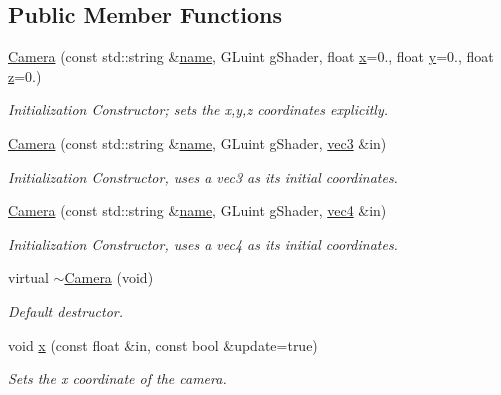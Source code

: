 \subsection*{Public Member Functions}
\begin{DoxyCompactItemize}
\item 
\hyperlink{class_camera_a16516fa8c830cecef5c8eb43eff12783}{Camera} (const std\-::string \&\hyperlink{class_object_aafd766fce2598f718cac97a3ac731706}{name}, G\-Luint g\-Shader, float \hyperlink{class_camera_a14d59ca64bf258adacbed4e0e70ba701}{x}=0., float \hyperlink{class_camera_a5021b8379a853f306851837178856db0}{y}=0., float \hyperlink{class_camera_a4acfa20291c83f13c98781c0d53cdbd8}{z}=0.)
\begin{DoxyCompactList}\small\item\em Initialization Constructor; sets the x,y,z coordinates explicitly. \end{DoxyCompactList}\item 
\hyperlink{class_camera_a24329612384948d2b64f78094fe84e75}{Camera} (const std\-::string \&\hyperlink{class_object_aafd766fce2598f718cac97a3ac731706}{name}, G\-Luint g\-Shader, \hyperlink{struct_angel_1_1vec3}{vec3} \&in)
\begin{DoxyCompactList}\small\item\em Initialization Constructor, uses a vec3 as its initial coordinates. \end{DoxyCompactList}\item 
\hyperlink{class_camera_aa131bc7f1bad2cc8baea463714c4485d}{Camera} (const std\-::string \&\hyperlink{class_object_aafd766fce2598f718cac97a3ac731706}{name}, G\-Luint g\-Shader, \hyperlink{struct_angel_1_1vec4}{vec4} \&in)
\begin{DoxyCompactList}\small\item\em Initialization Constructor, uses a vec4 as its initial coordinates. \end{DoxyCompactList}\item 
virtual \hyperlink{class_camera_a06211f202c145b3ec8253f96e1e654a6}{$\sim$\-Camera} (void)
\begin{DoxyCompactList}\small\item\em Default destructor. \end{DoxyCompactList}\item 
void \hyperlink{class_camera_a14d59ca64bf258adacbed4e0e70ba701}{x} (const float \&in, const bool \&update=true)
\begin{DoxyCompactList}\small\item\em Sets the x coordinate of the camera. \end{DoxyCompactList}\item 

\end{DoxyCompactItemize}
